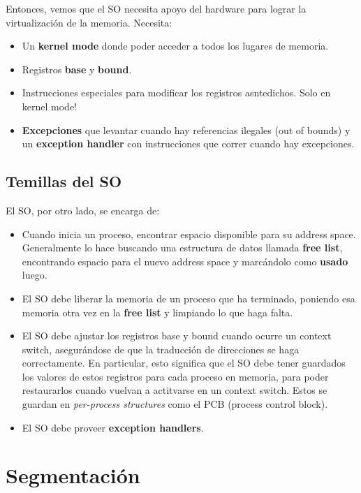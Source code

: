 \documentclass[12pt]{article}
\theoremstyle{definition}
\begin{document}
Entonces, vemos que el SO necesita apoyo del hardware para lograr la
virtualización de la memoria. Necesita: 

\begin{itemize}
    \item Un \textbf{kernel mode} donde poder acceder a todos los lugares de
        memoria. 
    \item Registros \textbf{base} y \textbf{bound}.
    \item  Instrucciones especiales para modificar los registros asntedichos.
        Solo en kernel mode! 
    \item \textbf{Excepciones} que levantar cuando hay referencias ilegales (out
        of bounds) y un \textbf{exception handler} con instrucciones que correr
        cuando hay excepciones.
\end{itemize}

\subsection{Temillas del SO}

El SO, por otro lado, se encarga de: 

\begin{itemize}
    \item Cuando inicia un proceso, encontrar espacio disponible para su address
        space. Generalmente lo hace buscando una estructura de datos llamada
        \textbf{free list}, encontrando espacio para el nuevo address space y
        marcándolo como \textbf{usado} luego. 
    \item El SO debe liberar la memoria de un proceso que ha terminado, poniendo
        esa memoria otra vez en la \textbf{free list} y limpiando lo que haga
        falta. 
    \item El SO debe ajustar los registros base y bound cuando ocurre un context
        switch, asegurándose de que la traducción de direcciones se haga
        correctamente. En particular, esto significa que el SO debe tener
        guardados los valores de estos registros para cada proceso en memoria,
        para poder restaurarlos cuando vuelvan a actitvarse en un context
        switch. Estos se guardan en \textit{per-process structures} como el PCB
        (process control block). 
    \item El SO debe proveer \textbf{exception handlers}.
\end{itemize}

\section{Segmentación}
\end{document}
